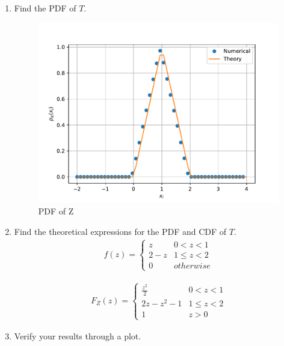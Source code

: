 \documentclass[10pt, a4paper]{article}
\begin{document}
\begin{enumerate}[label=\thesection.\arabic*
,ref=\thesection.\theenumi]
\item Find the PDF of $T$.
 \begin{figure}[!ht]
\centering
\includegraphics[scale=0.5]{images/5.4_pdf.pdf}
\caption{PDF of Z}
\end{figure}

 
 \begin{center}
\end{center}
\item Find the theoretical expressions for the PDF and CDF of $T$.
\begin{align}
f(z) = 
\begin{cases}
z & 0 < z < 1  \\
2-z & 1 \le z < 2 \\
0 & otherwise
\end{cases}
\end{align}

\begin{align}
F_Z(z) = 
\begin{cases}
\frac{z^2}{2} & 0 < z < 1  \\
2z-z^2-1 & 1 \le z < 2 \\
1 & z>0
\end{cases}
\end{align}


\item Verify your results through a plot. 
\end{enumerate}
\end{document}
